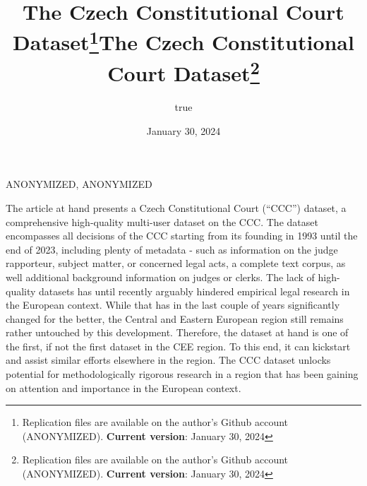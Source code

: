 \documentclass[
  11pt,
]{article}
\title{The Czech Constitutional Court Dataset\thanks{Replication files
are available on the author's Github account (ANONYMIZED).
\textbf{Current version}: January 30, 2024}}
\author{true}
\date{January 30, 2024}
\title{The Czech Constitutional Court Dataset\thanks{Replication files
are available on the author's Github account (ANONYMIZED).
\textbf{Current version}: January 30, 2024}  }
\date{}
\renewenvironment{abstract}
 {{%
    \setlength{\leftmargin}{0mm}
    \setlength{\rightmargin}{\leftmargin}%
  }%
  \relax}
 {\endlist}
\begin{document}



{%
\setlength{\parindent}{0pt}
\thispagestyle{plain}
{%
\maketitle  %

}




{
   \vskip 13.5pt\relax \normalsize\fontsize{11}{12}
   \MakeUppercase{ANONYMIZED}, \small{ANONYMIZED}   

}

}








\begin{abstract}


    \vskip 8.5pt %

\noindent \small{The article at hand presents a Czech Constitutional
Court (``CCC'') dataset, a comprehensive high-quality multi-user dataset
on the CCC. The dataset encompasses all decisions of the CCC starting
from its founding in 1993 until the end of 2023, including plenty of
metadata - such as information on the judge rapporteur, subject matter,
or concerned legal acts, a complete text corpus, as well additional
background information on judges or clerks. The lack of high-quality
datasets has until recently arguably hindered empirical legal research
in the European context. While that has in the last couple of years
significantly changed for the better, the Central and Eastern European
region still remains rather untouched by this development. Therefore,
the dataset at hand is one of the first, if not the first dataset in the
CEE region. To this end, it can kickstart and assist similar efforts
elsewhere in the region. The CCC dataset unlocks potential for
methodologically rigorous research in a region that has been gaining on
attention and importance in the European context.}




\end{abstract}
\end{document}
